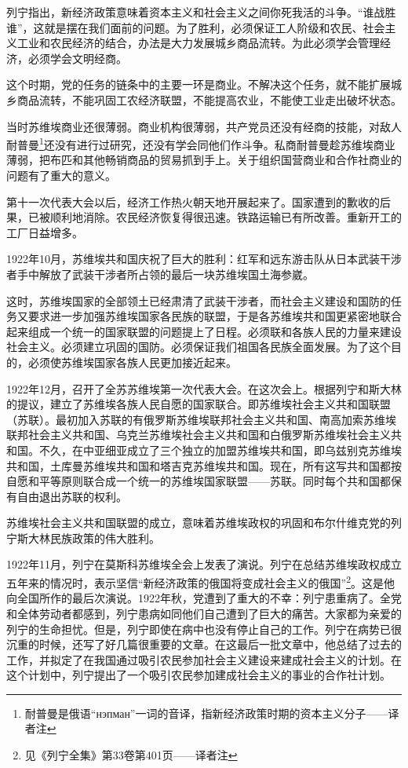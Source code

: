列宁指出，新经济政策意味着资本主义和社会主义之间你死我活的斗争。“谁战胜谁”，这就是摆在我们面前的问题。为了胜利，必须保证工人阶级和农民、社会主义工业和农民经济的结合，办法是大力发展城乡商品流转。为此必须学会管理经济，必须学会文明经商。

这个时期，党的任务的链条中的主要一环是商业。不解决这个任务，就不能扩展城乡商品流转，不能巩固工农经济联盟，不能提高农业，不能使工业走出破坏状态。

当时苏维埃商业还很薄弱。商业机构很薄弱，共产党员还没有经商的技能，对敌人耐普曼\footnote{耐普曼是俄语“нэпман”一词的音译，指新经济政策时期的资本主义分子——译者注}还没有进行过研究，还没有学会同他们作斗争。私商耐普曼趁苏维埃商业薄弱，把布匹和其他畅销商品的贸易抓到手上。关于组织国营商业和合作社商业的问题有了重大的意义。

第十一次代表大会以后，经济工作热火朝天地开展起来了。国家遭到的歉收的后果，已被顺利地消除。农民经济恢复得很迅速。铁路运输已有所改善。重新开工的工厂日益增多。

1922年10月，苏维埃共和国庆祝了巨大的胜利：红军和远东游击队从日本武装干涉者手中解放了武装干涉者所占领的最后一块苏维埃国土海参崴。

这时，苏维埃国家的全部领土已经肃清了武装干涉者，而社会主义建设和国防的任务又要求进一步加强苏维埃国家各民族的联盟，于是各苏维埃共和国更紧密地联合起来组成一个统一的国家联盟的问题提上了日程。必须联和各族人民的力量来建设社会主义。必须建立巩固的国防。必须保证我们祖国各民族全面发展。为了这个目的，必须使苏维埃国家各族人民更加接近起来。

1922年12月，召开了全苏苏维埃第一次代表大会。在这次会上。根据列宁和斯大林的提议，建立了苏维埃各族人民自愿的国家联合。即苏维埃社会主义共和国联盟（苏联）。最初加入苏联的有俄罗斯苏维埃联邦社会主义共和国、南高加索苏维埃联邦社会主义共和国、乌克兰苏维埃社会主义共和国和白俄罗斯苏维埃社会主义共和国。不久，在中亚细亚成立了三个独立的加盟苏维埃共和国，即乌兹别克苏维埃共和国，土库曼苏维埃共和国和塔吉克苏维埃共和国。现在，所有这写共和国都按自愿和平等原则联合成一个统一的苏维埃国家联盟——苏联。同时每个共和国都保有自由退出苏联的权利。

苏维埃社会主义共和国联盟的成立，意味着苏维埃政权的巩固和布尔什维克党的列宁斯大林民族政策的伟大胜利。

1922年11月，列宁在莫斯科苏维埃全会上发表了演说。列宁在总结苏维埃政权成立五年来的情况时，表示坚信“新经济政策的俄国将变成社会主义的俄国”\footnote{见《列宁全集》第33卷第401页——译者注}。这是他向全国所作的最后次演说。1922年秋，党遭到了重大的不幸：列宁患重病了。全党和全体劳动者都感到，列宁患病如同他们自己遭到了巨大的痛苦。大家都为亲爱的列宁的生命担忧。但是，列宁即使在病中也没有停止自己的工作。列宁在病势已很沉重的时候，还写了好几篇很重要的文章。在这最后一批文章中，他总结了过去的工作，并拟定了在我国通过吸引农民参加社会主义建设来建成社会主义的计划。在这个计划中，列宁提出了一个吸引农民参加建成社会主义的事业的合作社计划。

